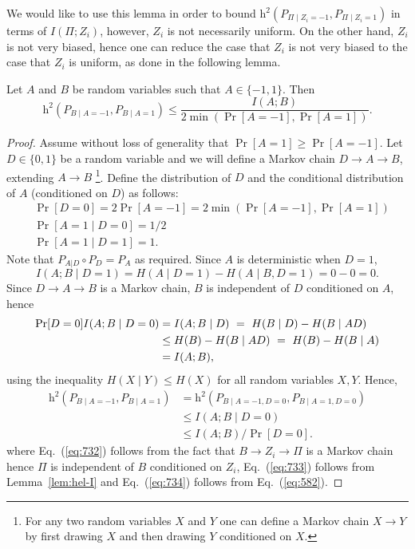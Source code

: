 \documentclass[final, 12pt]{colt2018}
\providecommand{\helli}{\mathrm{h}}
\renewcommand{\eqref}[1]{Eq.~(\ref{#1})}
\begin{document}
We would like to use this lemma in order to bound $\helli^2(P_{\Pi \mid Z_i = -1}, P_{\Pi \mid Z_i = 1})$ in terms of $I(\Pi; Z_i)$, however, $Z_i$ is not necessarily uniform. On the other hand, $Z_i$ is not very biased, hence one can reduce the case that $Z_i$ is not very biased to the case that $Z_i$ is uniform, as done in the following lemma.

\begin{lemma} \label{lem:zzi}
Let $A$ and $B$ be random variables such that $A \in \{-1,1\}$. Then
\[
\helli^2(P_{B\mid A=-1}, P_{B \mid A=1}) \le \frac{I(A; B)}{2 \min(\Pr[A=-1], \Pr[A=1])}.
\]
\end{lemma}

\begin{proof}
	Assume without loss of generality that $\Pr[A=1] \ge \Pr[A=-1]$.
	Let $D \in \{0, 1\}$ be a random variable and we will define a Markov chain $D \to A \to B$, extending $A \to B$ \footnote{For any two random variables $X$ and $Y$ one can define a Markov chain $X \to Y$ by first drawing $X$ and then drawing $Y$ conditioned on $X$.}. Define the distribution of $D$ and the conditional distribution of $A$ (conditioned on $D$) as follows:
	\begin{align*}
	&\Pr[D=0] = 2 \Pr[A=-1] = 2 \min(\Pr[A=-1], \Pr[A=1])  \\
	&\Pr[A=1 \mid D = 0] = 1/2 \\
	&\Pr[A=1 \mid D = 1] = 1.
	\end{align*}
	Note that $P_{A | D} \circ P_D = P_A$ as required. Since $A$ is deterministic when $D=1$, 
	\[
	I(A;B \mid D=1)= H(A \mid D=1) - H(A \mid B, D=1)=0-0=0.
	\]
	Since $D\to A \to B$ is a Markov chain, $B$ is independent of $D$ conditioned on $A$, hence
	\begin{align}
	\Pr[D=0] I(A; B \mid D=0)
	&= I(A ; B \mid D) 
	~=~ H(B \mid D) - H(B \mid AD) \notag\\
	&\le H(B) - H(B \mid AD) 
	~=~ H(B) - H(B \mid A) \notag\\
	&= I(A ; B), \label{eq:582}
	\end{align}
	using the inequality $H(X\mid Y) \le H(X)$ for all random variables $X,Y$.
	Hence,
	\begin{align}
	\helli^2(P_{B \mid A=-1}, P_{B \mid A=1})
	&= \helli^2(P_{B \mid A=-1, D=0}, P_{B \mid A=1, D=0}) \label{eq:732}\\
	&\le I(A ; B \mid D=0) \label{eq:733}\\
	&\le I(A; B) / \Pr[D=0]. \label{eq:734}
	\end{align}
	where \eqref{eq:732} follows from the fact that $B\to Z_i \to \Pi$ is a Markov chain hence $\Pi$ is independent of $B$ conditioned on $Z_i$, \eqref{eq:733} follows from Lemma~\ref{lem:hel-I} and \eqref{eq:734} follows from \eqref{eq:582}.
\end{proof}
\end{document}
